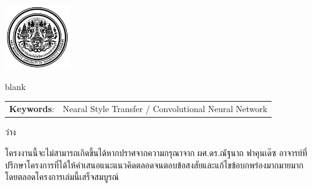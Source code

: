 \documentclass[12pt,oneside,openright,a4paper]{cpe-thai-project}
\begin{document}
\pdfstringdefDisableCommands{%
\let\MakeUppercase\relax
}

\begin{center}
\includegraphics[width=2.8cm]{logo02.jpg}
\end{center}
\vspace*{-1cm}

\maketitlepage
\makesignaturepage 

\abstract


blank

\begin{flushleft}
\begin{tabular*}{\textwidth}{@{}lp{}}
\textbf{Keywords}: & Nearal Style Transfer / Convolutional Neural Network
\end{tabular*}
\end{flushleft}
\endabstract

\thaiabstract

ว่าง


\endabstract


\preface
โครงงานนี้จะไม่สามารถเกิดขึ้นได้หากปราศจากความกรุณาจาก ผศ.ดร.ณัฐนาถ ฟาคุนเด๊ซ อาจารย์ที่ปรึกษาโครงการที่ได้ให้คำเสนอแนะแนวคิดตลอดจนตอบข้อสงสัยและแก้ไขข้อบกพร่องมากมายมากโดยตลอดโครงการเล่มนี้เสร็จสมบูรณ์
\end{document}
